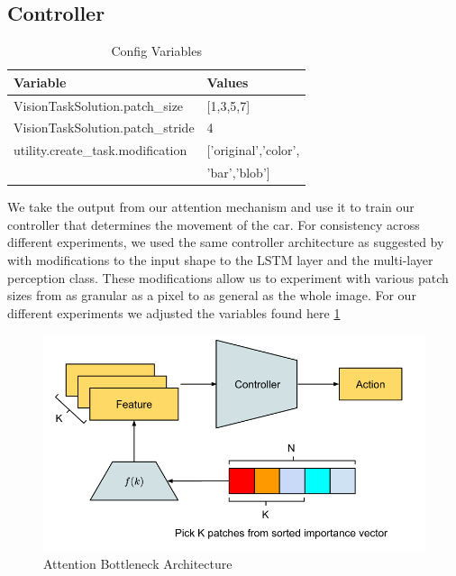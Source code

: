 \documentclass[10pt,twocolumn,letterpaper]{article}
\begin{document}
\subsection{Controller}
\begin{table}[h]
\centering
\caption{\label{tab:config}Config Variables}
\begin{tabular}{|l|l|}
\hline
Variable                                              & Values \\ \hline
VisionTaskSolution.patch\_size & [1,3,5,7]    \\ \hline
VisionTaskSolution.patch\_stride & 4   \\ \hline
utility.create\_task.modification          & ['original','color',   \\ 
                                            & 'bar','blob']   \\ \hline
\end{tabular}
\end{table}
We take the output from our attention mechanism and use it to train our controller that
determines the movement of the car. For consistency across different experiments, we 
used the same controller architecture as suggested by \cite{Tang} with modifications to
the input shape to the LSTM layer and the multi-layer perception class.
These modifications allow us to experiment with various patch sizes from as granular 
as a pixel to as general as the whole image.
For our different experiments we adjusted the variables found here \ref{tab:config}

\begin{figure}[h]
    \includegraphics[scale=0.29]{images/Tang.png}
    \caption{Attention Bottleneck Architecture \cite{Tang}}
    \label{fig:tang}
\end{figure}
\end{document}
